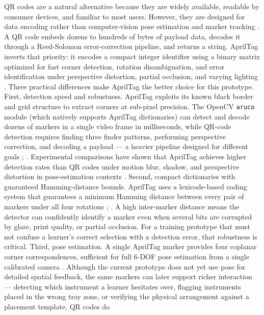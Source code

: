 \documentclass[10pt,a4paper]{article}
\begin{document}
QR codes are a natural alternative because they are widely available, readable
by consumer devices, and familiar to most users. However, they are designed for
data encoding rather than computer-vision pose estimation and marker tracking
\cite{opencv-aruco-detection-accessed-2026}. A QR
code embeds dozens to hundreds of bytes of payload data, decodes it through a
Reed-Solomon error-correction pipeline, and returns a string. AprilTag inverts
that priority: it encodes a compact integer identifier using a binary matrix
optimized for fast corner detection, rotation disambiguation, and error
identification under perspective distortion, partial occlusion, and varying
lighting \cite{olson-2011}.
Three practical differences make AprilTag the better choice for this prototype.
First, detection speed and robustness. AprilTag exploits its known black border
and grid structure to extract corners at sub-pixel precision. The OpenCV
\texttt{aruco} module (which natively supports AprilTag dictionaries) can detect and
decode dozens of markers in a single video frame in milliseconds, while QR-code
detection requires finding three finder patterns, performing perspective
correction, and decoding a payload — a heavier pipeline designed for different
goals \cite{garrido-jurado-et-al-2014};
\cite{romero-ramirez-et-al-2018}.
Experimental comparisons have shown that AprilTag achieves higher detection
rates than QR codes under motion blur, shadow, and perspective distortion in
pose-estimation contexts
\cite{kalaitzakis-et-al-2021}.
Second, compact dictionaries with guaranteed Hamming-distance bounds. AprilTag
uses a lexicode-based coding system that guarantees a minimum Hamming distance
between every pair of markers under all four rotations
\cite{olson-2011};
\cite{wang-et-al-2016-apriltag}. A high
inter-marker distance means the detector can confidently identify a marker even
when several bits are corrupted by glare, print quality, or partial occlusion.
For a training prototype that must not confuse a learner's correct selection
with a detection error, that robustness is critical.
Third, pose estimation. A single AprilTag marker provides four coplanar corner
correspondences, sufficient for full 6-DOF pose estimation from a single
calibrated camera \cite{olson-2011}. Although the
current prototype does not yet use pose for detailed spatial feedback, the same
markers can later support richer interaction — detecting which instrument a
learner hesitates over, flagging instruments placed in the wrong tray zone, or
verifying the physical arrangement against a placement template. QR codes do
\end{document}
